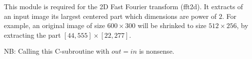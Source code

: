 This module is required for the 2D Fast Fourier transform ({\sf fft2d}).
It extracts of an input image its largest centered part which dimensions 
are power of $2$.
For example, an original image of size $600 \times 300$ will be shrinked to 
size $512 \times 256$, by extracting the part $[44,555]\times [22,277]$.

\vskip 0.5cm

NB: Calling this C-subroutine with $out=in$ is nonsense.